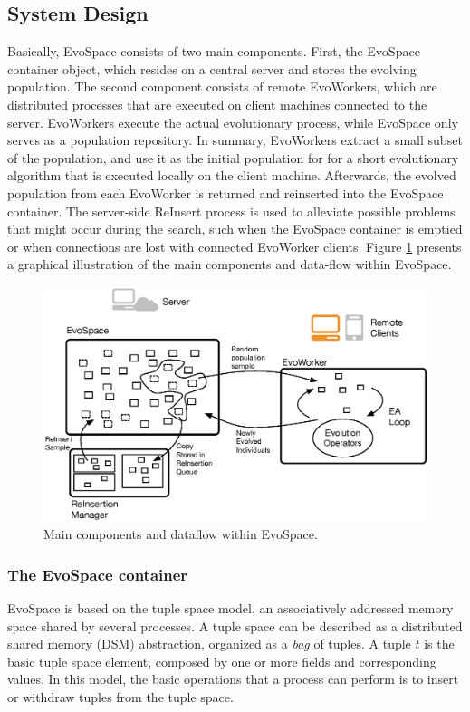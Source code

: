 \subsection{System Design}
Basically, EvoSpace consists of two main components.
First, the EvoSpace container object, which resides on a central server and stores the evolving population.
The second component consists of remote EvoWorkers, which are distributed processes that are executed on client machines connected to the server.
EvoWorkers execute the actual evolutionary process, while EvoSpace only serves as a population repository.
In summary, EvoWorkers extract a small subset of the population, and use it as the initial population for for a short evolutionary algorithm that is executed
locally on the client machine. Afterwards, the evolved population from each EvoWorker is returned and reinserted into the EvoSpace container.
The server-side ReInsert process is used to alleviate possible problems that might occur during the search, such when the EvoSpace container
is emptied or when connections are lost with connected EvoWorker clients.
Figure \ref{fig:evo} presents a graphical illustration of the main components and data-flow within EvoSpace.

\begin{figure}[t]
    \centering
        \includegraphics[width=12cm]{evospaceExample.eps}
    \caption{Main components and dataflow within EvoSpace.}
    \label{fig:evo}
\end{figure}

\subsubsection{The EvoSpace container}
EvoSpace is based on the tuple space model, an associatively addressed memory space shared by several processes.
A tuple space can be described as a distributed shared memory (DSM) abstraction, organized as a \emph{bag} of tuples.
A tuple $t$ is the basic tuple space element, composed by one or more fields and corresponding values.
In this model, the basic operations that a process can perform is to insert or withdraw tuples from the tuple space.


